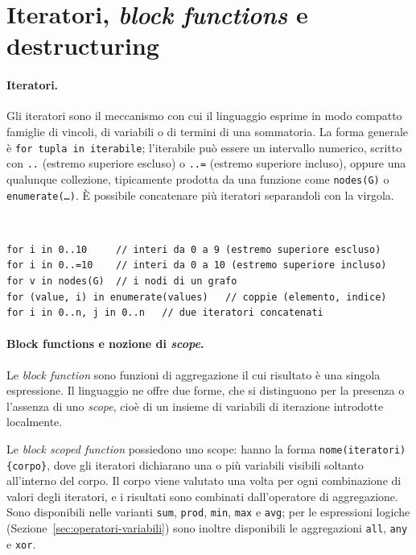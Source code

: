 \section{Iteratori, \emph{block functions} e destructuring}
\label{sec:iteratori}

\paragraph{Iteratori.}
Gli iteratori sono il meccanismo con cui il linguaggio esprime in modo compatto
famiglie di vincoli, di variabili o di termini di una sommatoria. La forma
generale è \texttt{for tupla in iterabile}; l'iterabile può essere un intervallo
numerico, scritto con \texttt{..} (estremo superiore escluso) o \texttt{..=}
(estremo superiore incluso), oppure una qualunque collezione, tipicamente
prodotta da una funzione come \texttt{nodes(G)} o \texttt{enumerate(\ldots)}. È
possibile concatenare più iteratori separandoli con la virgola.

\

\begin{lstlisting}[caption={Esempi di iteratori.}, label={lst:iteratori}]
for i in 0..10     // interi da 0 a 9 (estremo superiore escluso)
for i in 0..=10    // interi da 0 a 10 (estremo superiore incluso)
for v in nodes(G)  // i nodi di un grafo
for (value, i) in enumerate(values)   // coppie (elemento, indice)
for i in 0..n, j in 0..n   // due iteratori concatenati
\end{lstlisting}

\paragraph{Block functions e nozione di \emph{scope}.}
Le \emph{block function} sono funzioni di aggregazione il cui risultato è una
singola espressione. Il linguaggio ne offre due forme, che si distinguono per la
presenza o l'assenza di uno \emph{scope}, cioè di un insieme di variabili di
iterazione introdotte localmente.

Le \emph{block scoped function} possiedono uno scope: hanno la forma
\texttt{nome(iteratori)\{corpo\}}, dove gli iteratori dichiarano una o più
variabili visibili soltanto all'interno del corpo. Il corpo viene valutato una
volta per ogni combinazione di valori degli iteratori, e i risultati sono
combinati dall'operatore di aggregazione. Sono disponibili nelle varianti
\texttt{sum}, \texttt{prod}, \texttt{min}, \texttt{max} e \texttt{avg}; per le
espressioni logiche (Sezione~\ref{sec:operatori-variabili}) sono inoltre
disponibili le aggregazioni \texttt{all}, \texttt{any} e \texttt{xor}.

